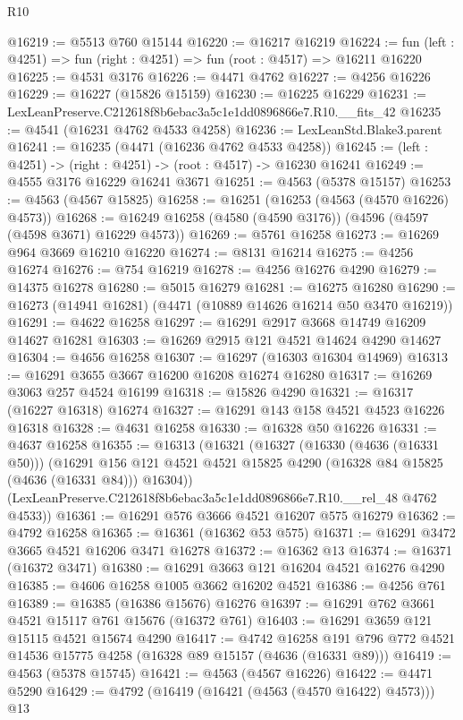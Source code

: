 \begin{lexlean}{R10}
\begin{coremodule}
@16219 := @5513 @760 @15144
@16220 := @16217 @16219
@16224 := fun (left : @4251) => fun (right : @4251) => fun (root : @4517) => @16211 @16220
@16225 := @4531 @3176
@16226 := @4471 @4762
@16227 := @4256 @16226
@16229 := @16227 (@15826 @15159)
@16230 := @16225 @16229
@16231 := LexLeanPreserve.C212618f8b6ebac3a5c1e1dd0896866e7.R10.__fits_42
@16235 := @4541 (@16231 @4762 @4533 @4258)
@16236 := LexLeanStd.Blake3.parent
@16241 := @16235 (@4471 (@16236 @4762 @4533 @4258))
@16245 := (left : @4251) -> (right : @4251) -> (root : @4517) -> @16230 @16241
@16249 := @4555 @3176 @16229 @16241 @3671
@16251 := @4563 (@5378 @15157)
@16253 := @4563 (@4567 @15825)
@16258 := @16251 (@16253 (@4563 (@4570 @16226) @4573))
@16268 := @16249 @16258 (@4580 (@4590 @3176)) (@4596 (@4597 (@4598 @3671) @16229 @4573))
@16269 := @5761 @16258
@16273 := @16269 @964 @3669 @16210 @16220
@16274 := @8131 @16214
@16275 := @4256 @16274
@16276 := @754 @16219
@16278 := @4256 @16276 @4290
@16279 := @14375 @16278
@16280 := @5015 @16279
@16281 := @16275 @16280
@16290 := @16273 (@14941 @16281) (@4471 (@10889 @14626 @16214 @50 @3470 @16219))
@16291 := @4622 @16258
@16297 := @16291 @2917 @3668 @14749 @16209 @14627 @16281
@16303 := @16269 @2915 @121 @4521 @14624 @4290 @14627
@16304 := @4656 @16258
@16307 := @16297 (@16303 @16304 @14969)
@16313 := @16291 @3655 @3667 @16200 @16208 @16274 @16280
@16317 := @16269 @3063 @257 @4524 @16199
@16318 := @15826 @4290
@16321 := @16317 (@16227 @16318) @16274
@16327 := @16291 @143 @158 @4521 @4523 @16226 @16318
@16328 := @4631 @16258
@16330 := @16328 @50 @16226
@16331 := @4637 @16258
@16355 := @16313
    (@16321
      (@16327
        (@16330 (@4636 (@16331 @50)))
        (@16291 @156 @121 @4521 @4521 @15825 @4290 (@16328 @84 @15825 (@4636 (@16331 @84))) @16304))
      (LexLeanPreserve.C212618f8b6ebac3a5c1e1dd0896866e7.R10.__rel_48 @4762 @4533))
@16361 := @16291 @576 @3666 @4521 @16207 @575 @16279
@16362 := @4792 @16258
@16365 := @16361 (@16362 @53 @575)
@16371 := @16291 @3472 @3665 @4521 @16206 @3471 @16278
@16372 := @16362 @13
@16374 := @16371 (@16372 @3471)
@16380 := @16291 @3663 @121 @16204 @4521 @16276 @4290
@16385 := @4606 @16258 @1005 @3662 @16202 @4521
@16386 := @4256 @761
@16389 := @16385 (@16386 @15676) @16276
@16397 := @16291 @762 @3661 @4521 @15117 @761 @15676 (@16372 @761)
@16403 := @16291 @3659 @121 @15115 @4521 @15674 @4290
@16417 := @4742
    @16258
    @191
    @796
    @772
    @4521
    @14536
    @15775
    @4258
    (@16328 @89 @15157 (@4636 (@16331 @89)))
@16419 := @4563 (@5378 @15745)
@16421 := @4563 (@4567 @16226)
@16422 := @4471 @5290
@16429 := @4792 (@16419 (@16421 (@4563 (@4570 @16422) @4573))) @13

\end{coremodule}
\end{lexlean}
